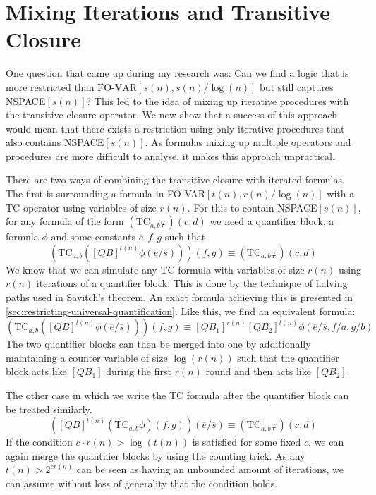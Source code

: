 \section{Mixing Iterations and Transitive Closure}\label{sec:mixing-iterations-and-transitive-closure}

\sloppy One question that came up during my research was: Can we find a logic that is more restricted than $\text{FO-VAR}[s(n), s(n)/\log(n)]$ but still captures NSPACE$[s(n)]$?
This led to the idea of mixing up iterative procedures with the transitive closure operator.
We now show that a success of this approach would mean that there exists a restriction using only iterative procedures that also contains NSPACE$[s(n)]$.
As formulas mixing up multiple operators and procedures are more difficult to analyse, it makes this approach unpractical.

There are two ways of combining the transitive closure with iterated formulas.
The first is surrounding a formula in FO-VAR$[t(n), r(n)/\log(n)]$ with a TC operator using variables of size $r(n)$.
For this to contain NSPACE$[s(n)]$, for any formula of the form $(\text{TC}_{a, b}\varphi)(c, d)$ we need a quantifier block, a formula $\phi$ and some constants $\overline{e}, f, g$ such that
\[
    \left(\text{TC}_{a, b}\left([QB]^{t(n)}\phi(\overline{e}/\overline{s})\right)\right)(f, g) \equiv (\text{TC}_{a, b}\varphi)(c, d)
\]
We know that we can simulate any TC formula with variables of size $r(n)$ using $r(n)$ iterations of a quantifier block.
This is done by the technique of halving paths used in Savitch's theorem.
An exact formula achieving this is presented in \cref{sec:restricting-universal-quantification}.
Like this, we find an equivalent formula:
\[
    \left(\text{TC}_{a, b}\left([QB]^{t(n)}\phi(\overline{e}/\overline{s})\right)\right)(f, g) \equiv [QB_1]^{r(n)}[QB_2]^{t(n)}\phi(\overline{e}/\overline{s}, f/a, g/b)
\]
The two quantifier blocks can then be merged into one by additionally maintaining a counter variable of size $\log(r(n))$ such that the quantifier block acts like $[QB_1]$ during the first $r(n)$ round and then acts like $[QB_2]$.

The other case in which we write the TC formula after the quantifier block can be treated similarly.
\[
    \left([QB]^{t(n)}\left(\text{TC}_{a, b}\phi\right)(f, g)\right)(\overline{e}/\overline{s}) \equiv (\text{TC}_{a, b}\varphi)(c, d)
\]
If the condition $c \cdot r(n) > \log(t(n))$ is satisfied for some fixed $c$, we can again merge the quantifier blocks by using the counting trick.
As any $t(n) > 2^{cr(n)}$ can be seen as having an unbounded amount of iterations, we can assume without loss of generality that the condition holds.

